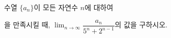 수열 $\{a_n\}$이 모든 자연수 $n$에 대하여 \par\smallskip{}\par\smallskip\noindent 을 만족시킬 때, $\displaystyle\lim_{n\to\infty}\dfrac{a_n}{5^n+2^{n-1}}$의 값을 구하시오.
